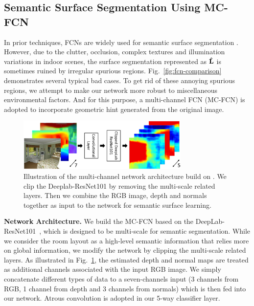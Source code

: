 \subsection{Semantic Surface Segmentation Using MC-FCN}
\label{sec:surfacelabel}
In prior techniques, FCNs are widely used for semantic surface segmentation \cite{dasgupta2016delay,ren2016coarse,mallya2015learning}. 
%
However, due to the clutter, occlusion, complex textures and illumination variations in indoor scenes, the surface segmentation represented as $\mathbf{\hat{L}}$ is sometimes ruined by irregular spurious regions. 
Fig.~\ref{fig:fcn-comparison} demonstrates several typical bad cases.
%
To get rid of these annoying spurious regions, we attempt to make our network more robust to miscellaneous environmental factors. 
And for this purpose, a multi-channel FCN (MC-FCN) is adopted to incorporate geometric hint generated from the original image. 
%


\begin{figure}
	\centering
	\includegraphics[width=8.5cm]{figure/MC-FCN.png}
	\caption{Illustration of the multi-channel network architecture build on \cite{chen2016deeplab}. We clip the Deeplab-ResNet101 by removing the multi-scale related layers. Then we combine the RGB image, depth and normals together as input to the network for semantic surface learning. }
	\label{fig:fcn-multi-channel}
\end{figure}


\noindent\textbf{Network Architecture.}
We build the MC-FCN based on the DeepLab-ResNet101~\cite{chen2016deeplab}, which is designed to be multi-scale for semantic segmentation. 
%
While we consider the room layout as a high-level semantic information that relies more on global information, we modify the network by clipping the multi-scale related layers. 
As illustrated in Fig.~\ref{fig:fcn-multi-channel}, the estimated depth and normal maps are treated as additional channels associated with the input RGB image. 
We simply concatenate different types of data to a seven-channels input (3 channels from RGB, 1 channel from depth and 3 channels from normals) which is then fed into our network. Atrous convolution is adopted in our 5-way classifier layer.

